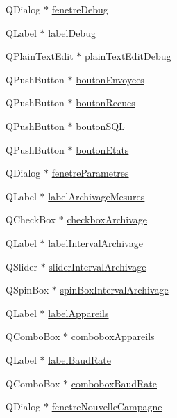 \begin{DoxyCompactItemize}
Q\+Dialog $\ast$ \hyperlink{class_i_h_m_rov_a393d23f9256a9db063dfef11d95cdc06}{fenetre\+Debug}
\item 
Q\+Label $\ast$ \hyperlink{class_i_h_m_rov_a667455d332d2abf2e42b897e6cc632f8}{label\+Debug}
\item 
Q\+Plain\+Text\+Edit $\ast$ \hyperlink{class_i_h_m_rov_ae2a7bec24a52ffd9e53baf1185ab6cd7}{plain\+Text\+Edit\+Debug}
\item 
Q\+Push\+Button $\ast$ \hyperlink{class_i_h_m_rov_a7a441ed53b0066edaf1f0acbea24e777}{bouton\+Envoyees}
\item 
Q\+Push\+Button $\ast$ \hyperlink{class_i_h_m_rov_ae56bf1c744f0fc393ef517e0e66b0d12}{bouton\+Recues}
\item 
Q\+Push\+Button $\ast$ \hyperlink{class_i_h_m_rov_a5dca475dd63a04c96386855a84c5effb}{bouton\+S\+QL}
\item 
Q\+Push\+Button $\ast$ \hyperlink{class_i_h_m_rov_a82f0ceba3dadd7a3d3251c236bf212a4}{bouton\+Etats}
\item 
Q\+Dialog $\ast$ \hyperlink{class_i_h_m_rov_a277956dfb79e5345e5ae0117fe41ddf2}{fenetre\+Parametres}
\item 
Q\+Label $\ast$ \hyperlink{class_i_h_m_rov_a58e157352986f690bca4b79b9b05ee1d}{label\+Archivage\+Mesures}
\item 
Q\+Check\+Box $\ast$ \hyperlink{class_i_h_m_rov_a85be76b5fee7281642db582a79a53511}{checkbox\+Archivage}
\item 
Q\+Label $\ast$ \hyperlink{class_i_h_m_rov_a42fb93c9764bfc2fe81ba65fc02d8de2}{label\+Interval\+Archivage}
\item 
Q\+Slider $\ast$ \hyperlink{class_i_h_m_rov_a8c55c93ee14ee51335e72af07b521312}{slider\+Interval\+Archivage}
\item 
Q\+Spin\+Box $\ast$ \hyperlink{class_i_h_m_rov_abc906e8e992ecdf5eb1dae5dc622b768}{spin\+Box\+Interval\+Archivage}
\item 
Q\+Label $\ast$ \hyperlink{class_i_h_m_rov_ac6f93c34da2a4e24f743e61fd5d62405}{label\+Appareils}
\item 
Q\+Combo\+Box $\ast$ \hyperlink{class_i_h_m_rov_a12b970f1d2a170f14a01a684787904a5}{combobox\+Appareils}
\item 
Q\+Label $\ast$ \hyperlink{class_i_h_m_rov_a6e9a97a5cd38bfd92e6114c4299be7ee}{label\+Baud\+Rate}
\item 
Q\+Combo\+Box $\ast$ \hyperlink{class_i_h_m_rov_a542c0cf87de612cd529b0753b60e4f95}{combobox\+Baud\+Rate}
\item 
Q\+Dialog $\ast$ \hyperlink{class_i_h_m_rov_a13c12a93de7fc77c32f0108ae73cec06}{fenetre\+Nouvelle\+Campagne}

\end{DoxyCompactItemize}
